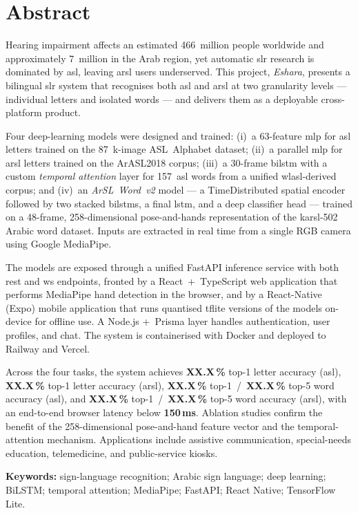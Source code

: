 \chapter*{Abstract}

Hearing impairment affects an estimated 466~million people worldwide and
approximately 7~million in the Arab region, yet automatic \gls{slr}
research is dominated by \gls{asl}, leaving \gls{arsl} users underserved.
This project, \emph{Eshara}, presents a bilingual \gls{slr} system that
recognises both \gls{asl} and \gls{arsl} at two granularity levels --- individual
letters and isolated words --- and delivers them as a deployable cross-platform
product.

Four deep-learning models were designed and trained: (i)~a 63-feature
\gls{mlp} for \gls{asl} letters trained on the 87~k-image ASL~Alphabet dataset;
(ii)~a parallel \gls{mlp} for \gls{arsl} letters trained on the ArASL2018
corpus; (iii)~a 30-frame \gls{bilstm} with a custom \emph{temporal attention}
layer for 157~\gls{asl} words from a unified \gls{wlasl}-derived corpus; and
(iv)~an \emph{ArSL~Word~v2} model --- a TimeDistributed spatial encoder
followed by two stacked \gls{bilstm}s, a final \gls{lstm}, and a deep
classifier head --- trained on a 48-frame, 258-dimensional pose-and-hands
representation of the \gls{karsl}-502 Arabic word dataset. Inputs are
extracted in real time from a single RGB camera using Google MediaPipe.

The models are exposed through a unified FastAPI inference service with
both \gls{rest} and \gls{ws} endpoints, fronted by a React~+~TypeScript
web application that performs MediaPipe hand detection in the browser,
and by a React-Native (Expo) mobile application that runs quantised
\gls{tflite} versions of the models on-device for offline use. A Node.js
+~Prisma layer handles authentication, user profiles, and chat. The
system is containerised with Docker and deployed to Railway and Vercel.

Across the four tasks, the system achieves \textbf{XX.X\,\%} top-1 letter
accuracy (\gls{asl}), \textbf{XX.X\,\%} top-1 letter accuracy (\gls{arsl}),
\textbf{XX.X\,\%} top-1~/~\textbf{XX.X\,\%} top-5 word accuracy (\gls{asl}),
and \textbf{XX.X\,\%} top-1~/~\textbf{XX.X\,\%} top-5 word accuracy (\gls{arsl}),
with an end-to-end browser latency below \textbf{150\,ms}. Ablation studies
confirm the benefit of the 258-dimensional pose-and-hand feature vector and
the temporal-attention mechanism. Applications include assistive
communication, special-needs education, telemedicine, and public-service
kiosks.

\vspace{12pt}
\noindent\textbf{Keywords:} sign-language recognition; Arabic sign language;
deep learning; BiLSTM; temporal attention; MediaPipe; FastAPI;
React Native; TensorFlow Lite.
